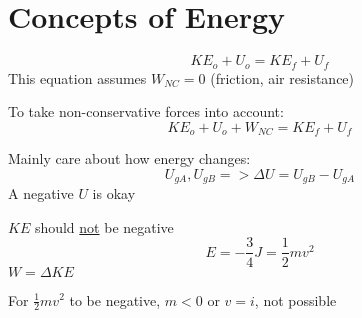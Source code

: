 \documentclass[fleqn]{article}
\begin{document}
\setlength{\mathindent}{0pt}
\section*{Concepts of Energy}
\[ KE_o+U_o=KE_f+U_f \]
This equation assumes $W_{NC} = 0$ (friction, air resistance)

To take non-conservative forces into account:
\[ KE_o + U_o + W _{NC} = KE_f + U_f \]

Mainly care about how energy changes:
\[ U _{gA}, U _{gB} => \Delta U =U _{gB} - U _{gA}  \]
A negative $U$ is okay

\bigbreak

$KE$ should \underline{not} be negative
\[ E=-\frac{3}{4} J= \frac{1}{2} mv^2\]
$W=\Delta KE$

For $\frac{1}{2} mv^2$ to be negative, $m<0$ or $v=i$, not possible
\end{document}
